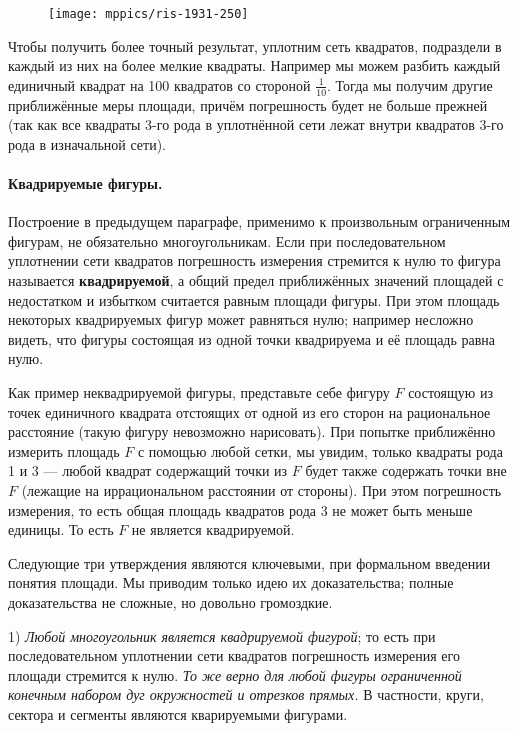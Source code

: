 \documentclass[twoside]{book}
\begin{document}
\begin{figure}
\centering
\texttt{[image: mppics/ris-1931-250]}
\caption{}\label{1931/ris-250}
\end{figure}

Чтобы получить более точный результат, уплотним сеть квадратов, подраздели в каждый из них на более
мелкие квадраты.
Например мы можем разбить каждый единичный квадрат на 100 квадратов со стороной $\tfrac1{10}$.
Тогда мы получим другие приближённые меры площади, причём погрешность будет не больше прежней (так как все квадраты 3-го рода в уплотнённой сети лежат внутри квадратов 3-го рода в изначальной сети).

\paragraph{Квадрируемые фигуры.}\label{extra/kvad-fig}
Построение в предыдущем параграфе, применимо к произвольным ограниченным фигурам, не обязательно многоугольникам.
Если при последовательном уплотнении сети квадратов погрешность измерения стремится к нулю
то фигура называется \textbf{квадрируемой}, а общий предел приближённых значений площадей с недостатком и избытком считается равным площади фигуры.
При этом площадь некоторых квадрируемых фигур может равняться нулю;
например несложно видеть, что фигуры состоящая из одной точки квадрируема и её площадь  равна нулю.

Как пример неквадрируемой фигуры, представьте себе фигуру $F$ состоящую из точек единичного квадрата отстоящих от одной из его сторон на рациональное расстояние (такую фигуру невозможно нарисовать). 
При попытке приближённо измерить площадь $F$ с помощью любой сетки, мы увидим, только квадраты рода 1 и 3 --- любой квадрат содержащий точки из $F$ будет также содержать точки вне $F$ (лежащие на иррациональном расстоянии от стороны).
При этом погрешность измерения, то есть общая площадь квадратов рода 3 не может быть меньше единицы. 
То есть $F$ не является квадрируемой.

Следующие три утверждения являются ключевыми, при формальном введении понятия площади.
Мы приводим только идею их доказательства; полные доказательства не сложные, но довольно громоздкие.

1) \emph{Любой многоугольник является квадрируемой фигурой};
то есть при последовательном уплотнении сети квадратов погрешность измерения его площади стремится к нулю. \emph{То же верно для любой фигуры ограниченной конечным набором дуг окружностей и отрезков прямых.}
В частности, круги, сектора и сегменты являются кварируемыми фигурами.
\end{document}
